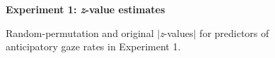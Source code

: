 \documentclass[authoryear, 12pt]{elsarticle}
\begin{document}
\begin{figure}
  \centering
  \textbf{Experiment 1: \textit{z}-value estimates}\par\medskip
  \hfill
  \caption{Random-permutation and original $|$\textit{z}-values$|$ for predictors of anticipatory gaze rates in Experiment 1.}
\label{fig:E1-Ts}
\end{figure}
\end{document}
